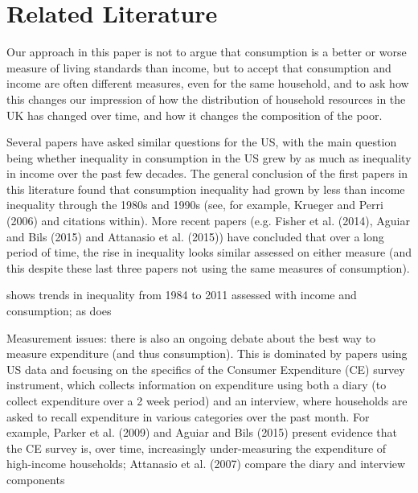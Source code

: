 \section{Related Literature}\label{sec:literature}


Our approach in this paper is not to argue that consumption is a better or worse measure of living standards than income, but to accept that consumption and income are often different measures, even for the same household, and to ask how this changes our impression of how the distribution of household resources in the UK has changed over time, and how it changes the composition of the poor. 

Several papers have asked similar questions for the US, with the main question being whether inequality in consumption in the US grew by as much as inequality in income over the past few decades. The general conclusion of the first papers in this literature found that consumption inequality had grown by less than income inequality through the 1980s and 1990s (see, for example, Krueger and Perri (2006) and citations within). More recent papers (e.g. Fisher et al. (2014), Aguiar and Bils (2015) and Attanasio et al. (2015)) have concluded that over a long period of time, the rise in inequality looks similar assessed on either measure (and this despite these last three papers not using the same measures of consumption).

 shows trends in inequality from 1984 to 2011 assessed with income and consumption; as does 

Measurement issues: there is also an ongoing debate about the best way to measure expenditure (and thus consumption). This is dominated by papers using US data and focusing on the specifics of the Consumer Expenditure (CE) survey instrument, which collects information on expenditure using both a diary (to collect expenditure over a 2 week period) and an interview, where households are asked to recall expenditure in various categories over the past month. For example, Parker et al. (2009) and Aguiar and Bils (2015) present evidence that the CE survey is, over time, increasingly under-measuring the expenditure of high-income households; Attanasio et al. (2007) compare the diary and interview components 
 
